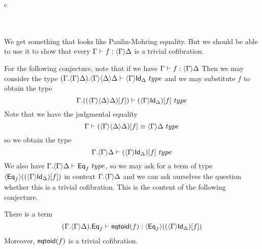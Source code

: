 \begin{infarray}{c}
\\
\\
          {}\\
          {}
\end{infarray}

We get something that looks like Paulin-Mohring equality. But we should be able to use it to
show that every $\jtermt{\Gamma}{\ctxwk{\Gamma}{\Delta}}{f}$ is a trivial cofibration.

For the following conjecture, note that if we have $\jtermt{\Gamma}{\ctxwk{\Gamma}{\Delta}}{f}$
Then we may consider the type $\jtype{\ctxext{{\Gamma}{\ctxwk{\Gamma}{\Delta}}}{\ctxwk{\Gamma}{{\Delta}{\Delta}}}}
{\ctxwk{\Gamma}{\idtypevar{\Delta}}}$ and we may substitute $f$ to obtain the type
\begin{equation*}
\jtype{\ctxext{\Gamma}{\subst{f}{\ctxwk{\Gamma}{{\Delta}{\Delta}}}}}
{\subst{f}{\ctxwk{\Gamma}{\idtypevar{\Delta}}}}
\end{equation*}
Note that we have the judgmental equality
\begin{equation*}
\jtypeeq{\Gamma}{\subst{f}{\ctxwk{\Gamma}{{\Delta}{\Delta}}}}{\ctxwk{\Gamma}{\Delta}}
\end{equation*}
so we obtain the type
\begin{equation*}
\jtype{\ctxext{\Gamma}{\ctxwk{\Gamma}{\Delta}}}
{\subst{f}{\ctxwk{\Gamma}{\idtypevar{\Delta}}}}
\end{equation*}
We also have $\jtype{\ctxext{\Gamma}{\ctxwk{\Gamma}{\Delta}}}{\eqtype{f}}$, so we
may ask for a term of type $\ctxwk{\eqtype{f}}{\subst{f}{\ctxwk{\Gamma}{\idtypevar{\Delta}}}}$
in context $\ctxext{\Gamma}{\ctxwk{\Gamma}{\Delta}}$ and we can ask ourselves the question
whether this is a trivial cofibration. This is the content of the following conjecture.

\begin{conj}
There is a term
\begin{equation*}
\jtermt{\ctxext{{\Gamma}{\ctxwk{\Gamma}{\Delta}}}{\eqtype{f}}}{\ctxwk{\eqtype{f}}{\subst{f}{\ctxwk{\Gamma}{\idtypevar{\Delta}}}}}{\eqtoid{f}}
\end{equation*}
Moreover, $\mathsf{eqtoid}(f)$ is a trivial cofibration.
\end{conj}

